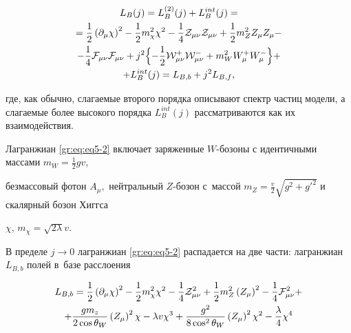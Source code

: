 \begin{multline}

 L_B(j)=L_B^{(2)}(j) + L_B^{int}(j)=

\\

=\frac{1}{2}\left(\partial_\mu\chi \right)^2 -\frac{1}{2}m_{\chi}^2\chi^2

- {\frac{1}{4}{\cal Z}_{\mu\nu}{\cal Z}_{\mu\nu}+\frac{1}{2}m_Z^2Z_\mu Z_\mu}-

\\

-{\frac{1}{4}{\cal F}_{\mu\nu}{\cal F}_{\mu\nu}} %



+j^2\Bigl\{-{\frac{1}{2}{\cal W}_{\mu\nu}^{+}{\cal W}_{\mu\nu}^{-}+m_W^2W_\mu^{+}W_\mu^{-} }\Bigr\} +

\\

 +L_B^{int}(j) =L_{B,b} + j^2 L_{B,f},

\label{gr:eq:eq5-2}

\end{multline}

где, как обычно, слагаемые второго порядка описывают спектр частиц модели, а слагаемые более высокого порядка $L_B^{int}(j)$  рассматриваются как их взаимодействия.

Лагранжиан \eqref{gr:eq:eq5-2} включает заряженные  $W$-бозоны с идентичными массами   $m_W=\frac{1}{2}gv$,

безмассовый фотон   $A_\mu, $ нейтральный $Z$-бозон с~массой $m_Z=\frac{v}{2}\sqrt{g^2+g'^2}$ и скалярный бозон Хиггса

 $ \chi$, $m_{\chi}=\sqrt{2\lambda}v$.

В пределе  $j\rightarrow 0$ лагранжиан \eqref{gr:eq:eq5-2} распадается на две части: лагранжиан $L_{B,b} $ полей в~базе расслоения

\begin{multline}

L_{B,b}=

\frac{1}{2}\left(\partial_\mu\chi \right)^2 -\frac{1}{2}m_{\chi}^2\chi^2

- {\frac{1}{4}{\cal Z}_{\mu\nu}^2 + \frac{1}{2}m_Z^2\left(Z_\mu\right)^2 }-

\frac{1}{4}{\cal F}_{\mu\nu}^2 +

\\

+\frac{g m_z}{2\cos \theta_W} \left(Z_{\mu}\right)^2 \chi -\lambda v \chi^3 %



+\frac{g^2 }{8\cos^2\theta_W} \left(Z_{\mu}\right)^2 \chi^2 - \frac{\lambda}{4} \chi^4

\label{gr:eq:5g}

\end{multline}

